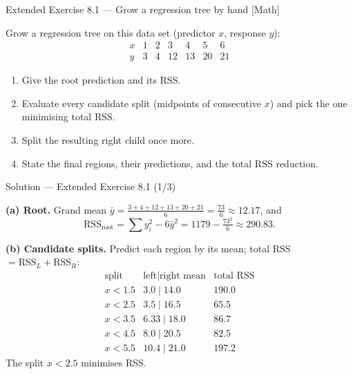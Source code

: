\documentclass[aspectratio=169,11pt]{beamer}
\begin{document}
\begin{frame}{Extended Exercise 8.1 --- Grow a regression tree by hand [Math]}
\begin{longexercise}
Grow a regression tree on this data set (predictor $x$, response $y$):
\[
\begin{array}{c|cccccc}
x & 1 & 2 & 3 & 4 & 5 & 6\\\hline
y & 3 & 4 & 12 & 13 & 20 & 21
\end{array}
\]
\begin{enumerate}
  \item Give the root prediction and its RSS.
  \item Evaluate every candidate split (midpoints of consecutive $x$) and pick the one minimising total RSS.
  \item Split the resulting right child once more.
  \item State the final regions, their predictions, and the total RSS reduction.
\end{enumerate}
\end{longexercise}
\end{frame}

\begin{frame}{Solution --- Extended Exercise 8.1 (1/3)}
\begin{solutionbox}
\textbf{(a) Root.} Grand mean $\bar y=\frac{3+4+12+13+20+21}{6}=\frac{73}{6}\approx12.17$, and
\[ \mathrm{RSS}_{\text{root}}=\textstyle\sum y_i^2 - 6\bar y^2 = 1179-\tfrac{73^2}{6}\approx 290.83. \]

\textbf{(b) Candidate splits.} Predict each region by its mean; total RSS $=\mathrm{RSS}_L+\mathrm{RSS}_R$:
\[
\begin{array}{c|c|c}
\text{split} & \text{left}\mid\text{right mean} & \text{total RSS}\\\hline
x<1.5 & 3.0\mid14.0 & 190.0\\
x<2.5 & 3.5\mid16.5 & \mathbf{65.5}\\
x<3.5 & 6.33\mid18.0 & 86.7\\
x<4.5 & 8.0\mid20.5 & 82.5\\
x<5.5 & 10.4\mid21.0 & 197.2
\end{array}
\]
The split $x<2.5$ minimises RSS.
\end{solutionbox}
\end{frame}
\end{document}
